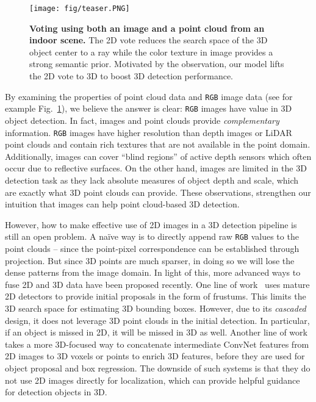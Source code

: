 \documentclass[10pt,twocolumn,letterpaper]{article}
\newcommand{\rgb}{\texttt{RGB}\xspace}
\begin{document}
\begin{figure}[t!]
    \centering
    \texttt{[image: fig/teaser.PNG]}
    \caption{\textbf{Voting using both an image and a point cloud from an indoor scene.} The 2D vote reduces the search space of the 3D object center to a ray while the color texture in image provides a strong semantic prior. Motivated by the observation, our model lifts the 2D vote to 3D to boost 3D detection performance.}
    \label{fig:teaser}
\end{figure}

By examining the properties of point cloud data and \rgb image data (see for example Fig.~\ref{fig:teaser}), we believe the answer is clear:  \rgb images have value in 3D object detection. In fact, images and point clouds provide \emph{complementary} information. \rgb images have higher resolution than depth images or LiDAR point clouds and contain rich textures that are not available in the point domain. Additionally, images can cover ``blind regions'' of active depth sensors which often occur due to reflective surfaces.  On the other hand, images are limited in the 3D detection task as they lack absolute measures of object depth and scale, which are exactly what 3D point clouds can provide. These observations, strengthen our intuition that images can help point cloud-based 3D detection.

However, how to make effective use of 2D images in a 3D detection pipeline is still an open problem. A na\"ive way is to directly append raw \rgb values to the point clouds -- since the point-pixel correspondence can be established through projection. But since 3D points are much sparser, in doing so we will lose the dense patterns from the image domain.
In light of this, more advanced ways to fuse 2D and 3D data have been proposed recently. 
One line of work~\cite{qi2018frustum,xu2018pointfusion,lahoud20172d} uses mature 2D detectors to provide initial proposals in the form of frustums. This limits the 3D search space for estimating 3D bounding boxes. However, due to its \emph{cascaded} design, it does not leverage 3D point clouds in the initial detection. In particular, if an object is missed in 2D, it will be missed in 3D as well.
Another line of work~\cite{song2016deep,ku2018joint,wang2019densefusion,hou20193d} takes a more 3D-focused way to concatenate intermediate ConvNet features from 2D images to 3D voxels or points to enrich 3D features, before they are used for object proposal and box regression. The downside of such systems is that they do not use 2D images directly for localization, which can provide helpful guidance for detection objects in 3D.
\end{document}
